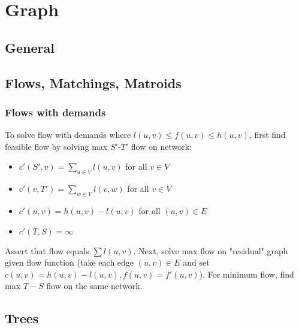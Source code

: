 \chapter{Graph}

\section{General}

\section{Flows, Matchings, Matroids}


	\subsection{Flows with demands}
	To solve flow with demands where $l(u, v) \leq f(u, v) \leq h(u, v)$, 
	first find feasible flow by solving max $S'$-$T'$ flow on network:
	\begin{itemize}[noitemsep,topsep=0pt]
		\item $c'(S',v)=\sum_{u \in V} l(u,v)$ for all $v \in V$
		\item $c'(v, T') = \sum_{w \in V} l(v, w)$ for all $v \in V$
		\item $c'(u, v) = h(u, v) - l(u, v)$ for all $(u, v) \in E$
		\item $c'(T,S)=\infty$
	\end{itemize}
	Assert that flow equals $\sum l(u, v)$. Next, solve max flow 
	on "residual" graph given flow function (take each edge
	$(u, v) \in E$ and set $c(u, v) = h(u, v) - l(u, v), f(u, v) = f'(u, v)$).
	For minimum flow, find max $T-S$ flow on the same network. 


\section{Trees}


